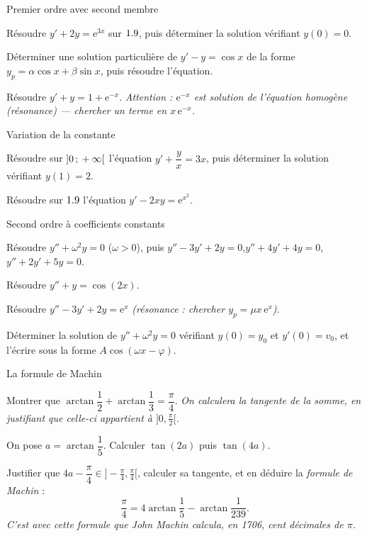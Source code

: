 \begin{exercice}[2]{Premier ordre avec second membre}
\begin{questions}
  \item Résoudre $y'+2y=\mathrm{e}^{3x}$ sur $1.9$, puis déterminer la solution
    vérifiant $y(0)=0$.
  \item Déterminer une solution particulière de $y'-y=\cos x$ de la forme
    $y_p=\alpha\cos x+\beta\sin x$, puis résoudre l'équation.
  \item Résoudre $y'+y=1+\mathrm{e}^{-x}$.
    \emph{Attention : $\mathrm{e}^{-x}$ est solution de l'équation homogène
    (résonance) — chercher un terme en $x\,\mathrm{e}^{-x}$.}
\end{questions}
\end{exercice}

\begin{exercice}[2]{Variation de la constante}
\begin{questions}
  \item Résoudre sur $\mathopen{]}0\,{;}\,+\infty\mathclose{[}$ l'équation
    $y'+\dfrac{y}{x}=3x$, puis déterminer la solution vérifiant $y(1)=2$.
  \item Résoudre sur $1.9$ l'équation $y'-2xy=\mathrm{e}^{x^{2}}$.
\end{questions}
\end{exercice}


\begin{exercice}[3]{Second ordre à coefficients constants}
\begin{questions}
  \item Résoudre $y''+\omega^{2}y=0$ ($\omega>0$), puis
    $y''-3y'+2y=0$,\quad $y''+4y'+4y=0$,\quad $y''+2y'+5y=0$.
  \item Résoudre $y''+y=\cos(2x)$.
  \item Résoudre $y''-3y'+2y=\mathrm{e}^{x}$
    \emph{(résonance : chercher $y_p=\mu x\,\mathrm{e}^{x}$)}.
  \item Déterminer la solution de $y''+\omega^{2}y=0$ vérifiant $y(0)=y_0$
    et $y'(0)=v_0$, et l'écrire sous la forme $A\cos(\omega x-\varphi)$.
\end{questions}
\end{exercice}

\begin{exercice}[3]{La formule de Machin}
\begin{questions}
  \item Montrer que $\arctan\dfrac12+\arctan\dfrac13=\dfrac{\pi}{4}$.
    \emph{On calculera la tangente de la somme, en justifiant que celle-ci
    appartient à $\bigl]0,\frac{\pi}{2}\bigr[$.}
  \item On pose $a=\arctan\dfrac15$. Calculer $\tan(2a)$ puis $\tan(4a)$.
  \item Justifier que $4a-\dfrac{\pi}{4}\in\bigl]-\frac{\pi}{4},\frac{\pi}{4}\bigr[$,
    calculer sa tangente, et en déduire la \emph{formule de Machin} :
    \[
      \frac{\pi}{4}=4\arctan\frac15-\arctan\frac{1}{239}.
    \]
    \emph{C'est avec cette formule que John Machin calcula, en 1706, cent
    décimales de $\pi$.}
\end{questions}
\end{exercice}

